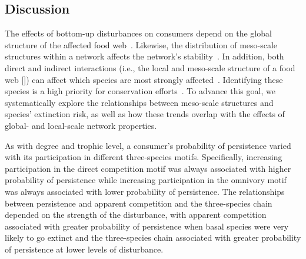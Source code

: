 \documentclass[12pt]{article}
\begin{document}
\begin{spacing}{2.0}


        




\section*{Discussion}

    The effects of bottom-up disturbances on consumers depend on the global structure of the affected food web~\citep{Dunne2002, Eklof2006, PascualDunne2006}.
    Likewise, the distribution of meso-scale structures within a network affects the network's stability~\citep{prill2005dynamic, bascompte2005simple}.
    In addition, both direct and indirect interactions (i.e., the local and meso-scale structure of a food web  [\citealp[]{Cirtwill2018FoodWebs}]) can affect which species are most strongly affected~\citep{curtsdotter2011robustness, dunne2009cascading, Eklof2006}. 
    Identifying these species is a high priority for conservation efforts~\citep{Bottrilletal2008}.
    To advance this goal, we systematically explore the relationships between meso-scale structures and species' extinction risk, as well as how these trends overlap with the effects of global- and local-scale network properties.

    
    As with degree and trophic level, a consumer's probability of persistence varied with its participation in different three-species motifs.
    Specifically, increasing participation in the direct competition motif was always associated with higher probability of persistence while increasing participation in the omnivory motif was always associated with lower probability of persistence.
    The relationships between persistence and apparent competition and the three-species chain depended on the strength of the disturbance, with apparent competition associated with greater probability of persistence when basal species were very likely to go extinct and the three-species chain associated with greater probability of persistence at lower levels of disturbance. 
    


\end{spacing}
\end{document}
